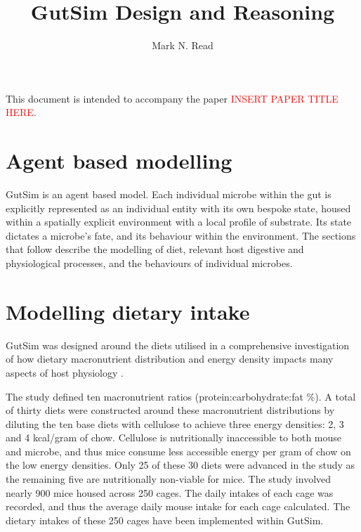 \documentclass{article}
\begin{document}
\newcommand{\hl}[1]{\textcolor{red}{#1}}
\newcommand{\nutstore}{\texttt{NutrientStore }}
\newcommand{\nutstores}{\texttt{NutrientStores }}

\title{GutSim Design and Reasoning}
\author{Mark N. Read}

\maketitle

This document is intended to accompany the paper \hl{INSERT PAPER TITLE HERE}. 

\section{Agent based modelling}

GutSim is an agent based model. 
Each individual microbe within the gut is explicitly represented as an individual entity with its own bespoke state, housed within a spatially explicit environment with a local profile of substrate. 
Its state dictates a microbe's fate, and its behaviour within the environment. 
The sections that follow describe the modelling of diet, relevant host digestive and physiological processes, and the behaviours of individual microbes. 

\section{Modelling dietary intake}

GutSim was designed around the diets utilised in a comprehensive investigation of how dietary macronutrient distribution and energy density impacts many aspects of host physiology \cite{Solon-Biet2014}. 

The study defined ten macronutrient ratios (protein:carbohydrate:fat \%). 
A total of thirty diets were constructed around these macronutrient distributions by diluting the ten base diets with cellulose to achieve three energy densities: 2, 3 and 4 kcal/gram of chow. 
Cellulose is nutritionally inaccessible to both mouse and microbe, and thus mice consume less accessible energy per gram of chow on the low energy densities. 
Only 25 of these 30 diets were advanced in the study as the remaining five are nutritionally non-viable for mice. 
The study involved nearly 900 mice housed across 250 cages. 
The daily intakes of each cage was recorded, and thus the average daily mouse intake for each cage calculated. 
The dietary intakes of these 250 cages have been implemented within GutSim. 
\end{document}
